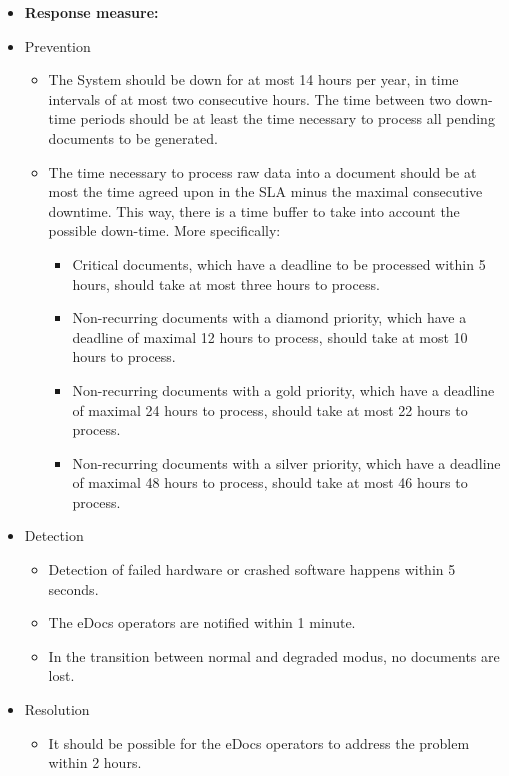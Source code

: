\documentclass[a4paper,10pt]{article}
\begin{document}
\begin{itemize}
    \item \textbf{Response measure:}
            \item Prevention
		\begin{itemize}
			\item The System should be down for at most 14 hours per year, in time intervals of at most two consecutive hours. The time between two down-time periods should be at least the time necessary to process all pending documents to be generated.
			\item The time necessary to process raw data into a document should be at most the time agreed upon in the SLA minus the maximal consecutive downtime. This way, there is a time buffer to take into account the possible down-time. More specifically:
			\begin{itemize}
			\item Critical documents, which have a deadline to be processed within 5 hours, should take at most three hours to process.
			\item Non-recurring documents with a diamond priority, which have a deadline of maximal 12 hours to process, should take at most 10 hours to process.
			\item Non-recurring documents with a gold priority, which have a deadline of maximal 24 hours to process, should take at most 22 hours to process.
			\item  Non-recurring documents with a silver priority, which have a deadline of maximal 48 hours to process, should take at most 46 hours to process.
			\end{itemize}
		\end{itemize}
            \item Detection
		\begin{itemize}
			\item Detection of failed hardware or crashed software happens within 5 seconds.
			\item The eDocs operators are notified within 1 minute.
			\item In the transition between normal and degraded modus, no documents are lost.
		\end{itemize}
            \item Resolution
		\begin{itemize}
			\item It should be possible for the eDocs operators to address the problem within 2 hours.
		\end{itemize}
\end{itemize}
\end{document}
